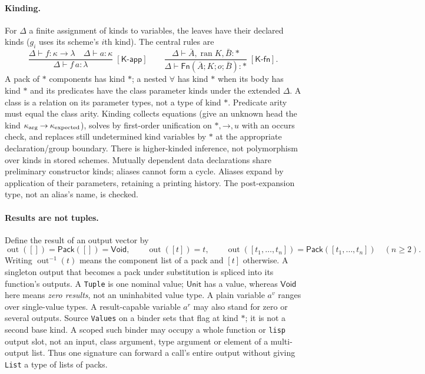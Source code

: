 \documentclass[11pt]{article}
\theoremstyle{definition}
\newcommand{\code}[1]{\texttt{#1}}
\newcommand{\pack}{\operatorname{out}}
\newcommand{\Fn}{\mathsf{Fn}}
\newcommand{\Pack}{\mathsf{Pack}}
\newcommand{\Unit}{\mathsf{Unit}}
\newcommand{\Void}{\mathsf{Void}}
\newcommand{\arr}{\mathbin{\to}}
\newcommand{\rrule}[3]{\frac{\displaystyle #2}{\displaystyle #3}
                       \;{\scriptstyle[\textsf{#1}]}}
\begin{document}
\paragraph{Kinding.}
For $\Delta$ a finite assignment of kinds to variables, the leaves have their
declared kinds ($g_i$ uses its scheme's $i$th kind). The central rules are
\[
 \rrule{K-app}{\Delta\vdash f:\kappa\arr\lambda\quad
                   \Delta\vdash a:\kappa}{\Delta\vdash f\,a:\lambda}
 \qquad
 \rrule{K-fn}{\Delta\vdash \bar A,\operatorname{ran}K,\bar B:*}
             {\Delta\vdash\Fn(\bar A;K;o;\bar B):*}.
\]
A pack of $*$ components has kind $*$; a nested $\forall$ has kind $*$ when
its body has kind $*$ and its predicates have the class parameter kinds
under the extended $\Delta$. A class is a relation on its parameter types,
not a type of kind $*$. Predicate arity must equal the class arity. Kinding
collects equations (give an unknown head the kind
$\kappa_{\rm arg}\arr\kappa_{\rm expected}$), solves by first-order
unification on $*,\arr,u$ with an occurs check, and replaces still
undetermined kind variables by $*$ at the appropriate declaration/group
boundary. There is higher-kinded inference, not polymorphism over kinds in
stored schemes. Mutually dependent data declarations share preliminary
constructor kinds; aliases cannot form a cycle. Aliases expand by application
of their parameters, retaining a printing history. The post-expansion type,
not an alias's name, is checked.

\paragraph{Results are not tuples.}
Define the result of an output vector by
\[
 \pack([])=\Pack([])=\Void,\qquad
 \pack([t])=t,\qquad
 \pack([t_1,\ldots,t_n])=\Pack([t_1,\ldots,t_n])\quad(n\ge2).
\]
Writing $\pack^{-1}(t)$ means the component list of a pack and $[t]$
otherwise. A singleton output that becomes a pack under substitution is
spliced into its function's outputs. A \code{Tuple} is one nominal value;
$\Unit$ has a value, whereas $\Void$ here means \emph{zero results}, not
an uninhabited value type. A plain variable $a^v$ ranges over single-value
types. A result-capable variable $a^r$ may also stand for zero or several
outputs. Source \code{Values} on a binder sets that flag at kind $*$; it
is not a second base kind. A scoped such binder may occupy a whole function
or \code{lisp} output slot, not an input, class argument, type argument or
element of a multi-output list. Thus one signature can forward a call's
entire output without giving \code{List} a type of lists of packs.
\end{document}
